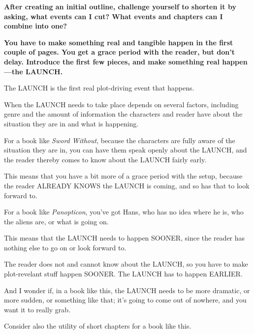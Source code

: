 \begin{compactdesc}
		\item[\tr{004}] \textbf{After creating an initial outline, challenge yourself to shorten it by asking, what events can I cut? What events and chapters can I combine into one?}
		
		\item[\tr{005}] \textbf{You have to make something real and tangible happen in the first couple of pages. You get a grace period with the reader, but don't delay. Introduce the first few pieces, and make something real happen---the LAUNCH.}
			\begin{compactitem}
				\item The LAUNCH is the first real plot-driving event that happens.
				\item When the LAUNCH needs to take place depends on several factors, including genre and the amount of information the characters and reader have about the situation they are in and what is happening.
				\item For a book like \textit{Sword Without}, because the characters are fully aware of the situation they are in, you can have them speak openly about the LAUNCH, and the reader thereby comes to know about the LAUNCH fairly early.
					\begin{compactitem}
						\item This means that you have a bit more of a grace period with the setup, because the reader ALREADY KNOWS the LAUNCH is coming, and so has that to look forward to.
					\end{compactitem}
				\item For a book like \textit{Panopticon}, you've got Hans, who has no idea where he is, who the aliens are, or what is going on. 
					\begin{compactitem}
						\item This means that the LAUNCH needs to happen SOONER, since the reader has nothing else to go on or look forward to.
						\item The reader does not and cannot know about the LAUNCH, so you have to make plot-revelant stuff happen SOONER. The LAUNCH has to happen EARLIER.
						\item And I wonder if, in a book like this, the LAUNCH needs to be more dramatic, or more sudden, or something like that; it's going to come out of nowhere, and you want it to really grab.
						\item Consider also the utility of short chapters for a book like this.
					\end{compactitem}
			\end{compactitem}
			

\end{compactdesc}
